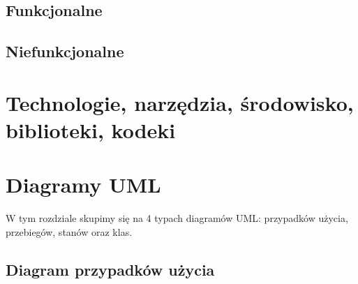 \documentclass{article}
\begin{document}
	\subsection{Funkcjonalne}
	
	\subsection{Niefunkcjonalne}
	
	\section{Technologie, narzędzia, środowisko, biblioteki, kodeki}
	
	\section{Diagramy UML}
	{W tym rozdziale skupimy się na 4 typach diagramów UML: przypadków użycia, przebiegów, stanów oraz klas.}
	\subsection{Diagram przypadków użycia}
	
\end{document}
